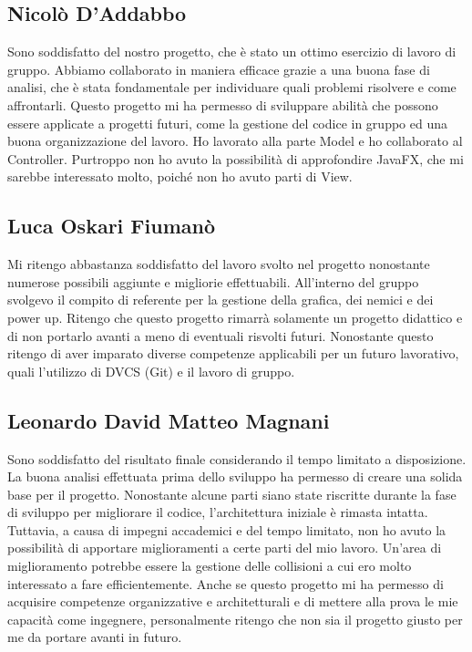\documentclass[a4paper,12pt]{report}
\begin{document}
\subsection*{Nicolò D'Addabbo}
Sono soddisfatto del nostro progetto, che è stato un ottimo esercizio di lavoro di gruppo. Abbiamo collaborato in maniera efficace grazie a una buona fase di analisi, che è stata fondamentale per individuare quali problemi risolvere e come affrontarli. Questo progetto mi ha permesso di sviluppare abilità che possono essere applicate a progetti futuri, come la gestione del codice in gruppo ed una buona organizzazione del lavoro.
Ho lavorato alla parte Model e ho collaborato al Controller. Purtroppo non ho avuto la possibilità di approfondire JavaFX, che mi sarebbe interessato molto, poiché non ho avuto parti di View.
\subsection*{Luca Oskari Fiumanò}
Mi ritengo abbastanza soddisfatto del lavoro svolto nel progetto nonostante numerose possibili aggiunte e migliorie effettuabili. 
All’interno del gruppo svolgevo il compito di referente per la gestione della grafica, dei nemici e dei power up. 
Ritengo che questo progetto rimarrà solamente un progetto didattico e di non portarlo avanti a meno di eventuali risvolti futuri. 
Nonostante questo ritengo di aver imparato diverse competenze applicabili per un futuro lavorativo, quali l’utilizzo di DVCS (Git) e il lavoro di gruppo.
\subsection*{Leonardo David Matteo Magnani}
Sono soddisfatto del risultato finale considerando il tempo limitato a disposizione. 
La buona analisi effettuata prima dello sviluppo ha permesso di creare una solida base per il progetto. 
Nonostante alcune parti siano state riscritte durante la fase di sviluppo per migliorare il codice, l'architettura iniziale è rimasta intatta. 
Tuttavia, a causa di impegni accademici e del tempo limitato, non ho avuto la possibilità di apportare miglioramenti a certe parti del mio lavoro. 
Un'area di miglioramento potrebbe essere la gestione delle collisioni a cui ero molto interessato a fare efficientemente.
Anche se questo progetto mi ha permesso di acquisire competenze organizzative e architetturali e di mettere alla prova le mie capacità come ingegnere, 
personalmente ritengo che non sia il progetto giusto per me da portare avanti in futuro.
\end{document}
